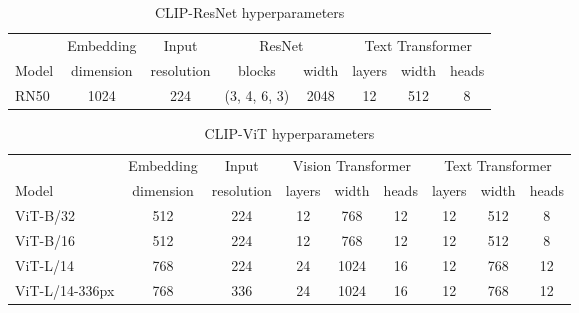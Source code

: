 \documentclass[letterpaper]{article} \usepackage{aaai23}  \usepackage{times}  \usepackage{helvet}  \usepackage{courier}  \usepackage[hyphens]{url}  \usepackage{graphicx} \urlstyle{rm} \def\UrlFont{\rm}  \usepackage{natbib}  \usepackage{caption} \frenchspacing  \setlength{\pdfpagewidth}{8.5in}  \setlength{\pdfpageheight}{11in}  \usepackage{algorithm}
\begin{document}
\begin{table*}
\small
\centering
\caption{CLIP-ResNet hyperparameters}
\begin{tabular}{l|ccccccc} \toprule
           & Embedding & Input      & \multicolumn{2}{c}{ResNet}  & \multicolumn{3}{c}{Text Transformer} \\
    Model  & dimension & resolution & blocks & width  & layers & width & heads  \\ \midrule
    RN50   & 1024 & 224 & (3, 4, 6, 3) & 2048 & 12 & 512 & 8 \\
\bottomrule
\end{tabular}
\label{resnet}
\end{table*}

\begin{table*}[h]
\small
\centering
\caption{CLIP-ViT hyperparameters}
\begin{tabular}{l|cccccccc} \toprule
           & Embedding & Input      & \multicolumn{3}{c}{Vision Transformer} & \multicolumn{3}{c}{Text Transformer} \\
    Model  & dimension & resolution & layers & width & heads  & layers & width & heads \\ \midrule
    ViT-B/32 & 512 & 224 & 12 & 768 & 12 & 12 & 512 & 8 \\
    ViT-B/16 & 512 & 224 & 12 & 768 & 12 & 12 & 512 & 8 \\
    ViT-L/14 & 768 & 224 & 24 & 1024 & 16 & 12 & 768 & 12 \\
    ViT-L/14-336px  & 768 & 336 & 24 & 1024 & 16 & 12 & 768 & 12 \\
    \bottomrule
\end{tabular}
\label{vit}
\end{table*}
\end{document}
